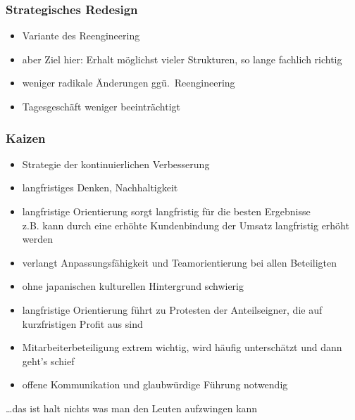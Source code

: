 \documentclass[a4paper, 12pt]{article}
\begin{document}
\subsubsection*{Strategisches Redesign}
\begin{itemize}
  \item Variante des Reengineering
  \item aber Ziel hier: Erhalt möglichst vieler Strukturen, so lange fachlich richtig
\end{itemize}
\begin{itemize}
  \renewcommand{\labelitemi}{+}%
  \item weniger radikale Änderungen ggü.\ Reengineering
  \item Tagesgeschäft weniger beeinträchtigt
\end{itemize}

\subsubsection*{Kaizen}
\begin{itemize}
  \item Strategie der kontinuierlichen Verbesserung
  \item langfristiges Denken, Nachhaltigkeit
\end{itemize}
\begin{itemize}
  \renewcommand{\labelitemi}{+}%
  \item langfristige Orientierung sorgt langfristig für die besten Ergebnisse\\
    z.B. kann durch eine erhöhte Kundenbindung der Umsatz langfristig erhöht werden
\end{itemize}
\begin{itemize}
  \renewcommand{\labelitemi}{\(-\)}%
  \item verlangt Anpassungsfähigkeit und Teamorientierung bei allen Beteiligten
  \item ohne japanischen kulturellen Hintergrund schwierig
  \item langfristige Orientierung führt zu Protesten der Anteilseigner, die auf kurzfristigen Profit aus sind
  \item Mitarbeiterbeteiligung extrem wichtig, wird häufig unterschätzt und dann geht's schief
  \item offene Kommunikation und glaubwürdige Führung notwendig
\end{itemize}
\ldots das ist halt nichts was man den Leuten aufzwingen kann
\end{document}
